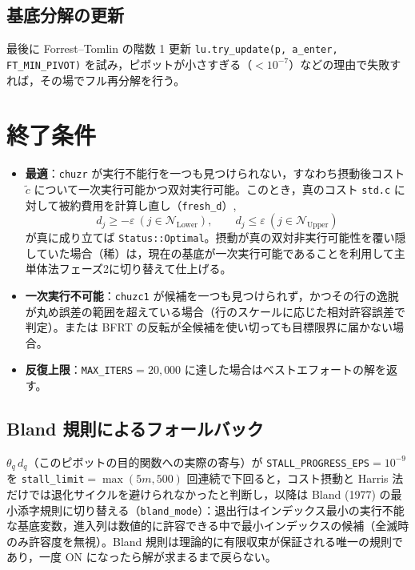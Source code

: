 \documentclass[11pt,a4paper]{ltjsarticle}
\newcommand{\code}[1]{\texttt{#1}}
\begin{document}
\subsection{基底分解の更新}

最後に Forrest--Tomlin の階数 1 更新 \code{lu.try\_update(p, a\_enter, FT\_MIN\_PIVOT)} を試み，ピボットが小さすぎる（$<10^{-7}$）などの理由で失敗すれば，その場でフル再分解を行う。

\section{終了条件}

\begin{itemize}
  \item \textbf{最適}：\code{chuzr} が実行不能行を一つも見つけられない，すなわち摂動後コスト $\tilde c$ について一次実行可能かつ双対実行可能。このとき，真のコスト \code{std.c} に対して被約費用を計算し直し（\code{fresh\_d}）,
  \[
    d_j \ge -\varepsilon\ (j\in\mathcal N_{\mathrm{Lower}}), \qquad d_j \le \varepsilon\ (j\in\mathcal N_{\mathrm{Upper}})
  \]
  が真に成り立てば \code{Status::Optimal}。摂動が真の双対非実行可能性を覆い隠していた場合（稀）は，現在の基底が一次実行可能であることを利用して主単体法フェーズ2に切り替えて仕上げる。
  \item \textbf{一次実行不可能}：\code{chuzc1} が候補を一つも見つけられず，かつその行の逸脱が丸め誤差の範囲を超えている場合（行のスケールに応じた相対許容誤差で判定）。または BFRT の反転が全候補を使い切っても目標限界に届かない場合。
  \item \textbf{反復上限}：\code{MAX\_ITERS}$=20{,}000$ に達した場合はベストエフォートの解を返す。
\end{itemize}

\subsection{Bland 規則によるフォールバック}

$\theta_q\, d_q$（このピボットの目的関数への実際の寄与）が \code{STALL\_PROGRESS\_EPS}$=10^{-9}$ を \code{stall\_limit}$=\max(5m,500)$ 回連続で下回ると，コスト摂動と Harris 法だけでは退化サイクルを避けられなかったと判断し，以降は Bland (1977) の最小添字規則に切り替える（\code{bland\_mode}）：退出行はインデックス最小の実行不能な基底変数，進入列は数値的に許容できる中で最小インデックスの候補（全滅時のみ許容度を無視）。Bland 規則は理論的に有限収束が保証される唯一の規則であり，一度 ON になったら解が求まるまで戻らない。
\end{document}
